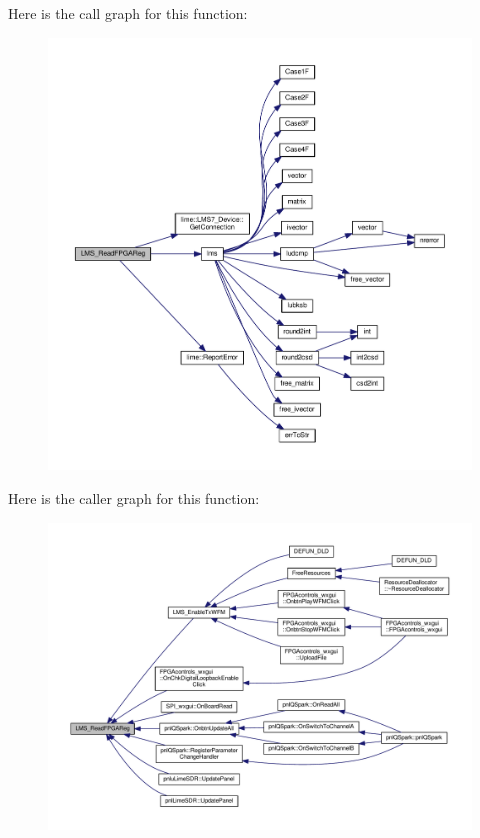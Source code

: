 Here is the call graph for this function\+:
\nopagebreak
\begin{figure}[H]
\begin{center}
\leavevmode
\includegraphics[width=350pt]{df/de1/lms7__api_8cpp_a9732243494479ad720f1b4d8cc12c3f7_cgraph}
\end{center}
\end{figure}




Here is the caller graph for this function\+:
\nopagebreak
\begin{figure}[H]
\begin{center}
\leavevmode
\includegraphics[width=350pt]{df/de1/lms7__api_8cpp_a9732243494479ad720f1b4d8cc12c3f7_icgraph}
\end{center}
\end{figure}


